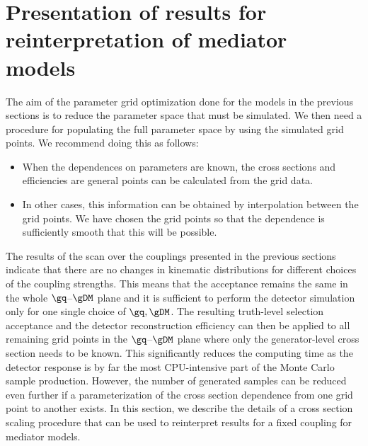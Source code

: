 

\section{Presentation of results for reinterpretation of \schannel mediator models}
\label{sec:monojet_scaling}

The aim of the parameter grid optimization done for the \schannel models in the previous sections is to reduce the parameter space that must be simulated.  We then need a procedure for populating the full parameter space by using the simulated grid points.  We recommend doing this as follows:

\begin{itemize}
\item When the dependences on parameters are known, the cross
  sections and efficiencies are general points can be calculated from
  the grid data.
\item In other cases, this information can be obtained by interpolation
  between the grid points.  We have chosen the grid points so that the
  dependence is sufficiently smooth that this will be possible.
\end{itemize}

The results of the scan over the couplings presented in the previous sections indicate that there are no changes in kinematic distributions for different choices of the coupling strengths. This means that the acceptance remains the same in the whole $\gq$--$\gDM$ plane and it is sufficient to perform the detector simulation only for one single choice of $\gq, \gDM$. The resulting truth-level selection acceptance and the detector reconstruction efficiency can then be applied to all remaining grid points in the $\gq$--$\gDM$ plane where only the generator-level cross section needs to be known. This significantly reduces the computing time as the detector response is by far the most CPU-intensive part of the Monte Carlo sample production.
However, the number of generated samples can be reduced even further
if a parameterization of the cross section dependence from one grid point to another exists.
In this section, we describe the details of a cross section scaling procedure that
can be used to reinterpret results for a fixed coupling for \schannel mediator models.

